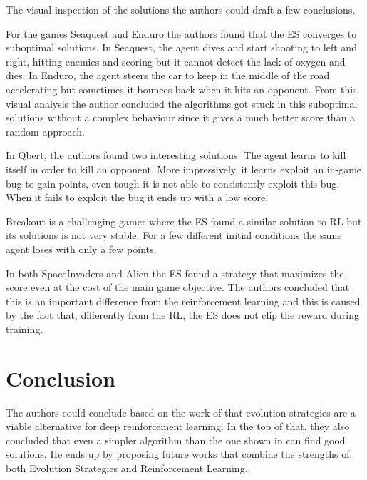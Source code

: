 \documentclass[10pt]{article} %
\begin{document}
The visual inspection of the solutions the authors could draft a few conclusions.

For the games Seaquest and Enduro the authors found that the ES converges to suboptimal solutions. In Seaquest, the agent dives and start shooting to left and right, hitting enemies and scoring but it cannot detect the lack of oxygen and dies. In Enduro, the agent steers the car to keep in the middle of the road accelerating but sometimes it bounces back when it hits an opponent. From this visual analysis the author concluded the algorithms got stuck in this suboptimal solutions without a complex behaviour since it gives a much better score than a random approach.

In Qbert, the authors found two interesting solutions. The agent learns to kill itself in order to kill an opponent. More impressively, it learns exploit an in-game bug to gain points, even tough it is not able to consistently exploit this bug. When it fails to exploit the bug it ends up with a low score.

Breakout is a challenging gamer where the ES found a similar solution to RL but its solutions is not very stable. For a few different initial conditions the same agent loses with only a few points.

In both SpaceInvaders and Alien the ES found a strategy that maximizes the score even at the cost of the main game objective. The authors concluded that this is an important difference from the reinforcement learning and this is caused by the fact that, differently from the RL, the ES does not clip the reward during training.

\section{Conclusion}
The authors could conclude based on the work of \cite{salimans2017evolution} that evolution strategies are a viable alternative for deep reinforcement learning. In the top of that, they also concluded  that even a simpler algorithm than the one shown in \cite{salimans2017evolution} can find good solutions. He ends up by proposing future works that combine the strengths of both Evolution Strategies and Reinforcement Learning.
{}

\end{document}

